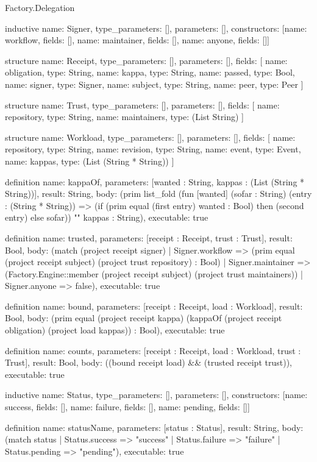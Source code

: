 \begin{lexlean}{Factory.Delegation}
\begin{semanticmodule}
inductive{
  name: Signer,
  type_parameters: [],
  parameters: [],
  constructors: [{name: workflow, fields: []}, {name: maintainer, fields: []}, {name: anyone, fields: []}]
}

structure{
  name: Receipt,
  type_parameters: [],
  parameters: [],
  fields: [
    {name: obligation, type: String},
    {name: kappa, type: String},
    {name: passed, type: Bool},
    {name: signer, type: Signer},
    {name: subject, type: String},
    {name: peer, type: Peer}
  ]
}

structure{
  name: Trust,
  type_parameters: [],
  parameters: [],
  fields: [
    {name: repository, type: String},
    {name: maintainers, type: (List String)}
  ]
}

structure{
  name: Workload,
  type_parameters: [],
  parameters: [],
  fields: [
    {name: repository, type: String},
    {name: revision, type: String},
    {name: event, type: Event},
    {name: kappas, type: (List (String * String))}
  ]
}

definition{
  name: kappaOf,
  parameters: [wanted : String, kappas : (List (String * String))],
  result: String,
  body: (prim list_fold (fun [wanted] (sofar : String) (entry : (String * String)) => (if (prim equal (first entry) wanted : Bool) then (second entry) else sofar)) "" kappas : String),
  executable: true
}

definition{
  name: trusted,
  parameters: [receipt : Receipt, trust : Trust],
  result: Bool,
  body: (match (project receipt signer)
      | Signer.workflow => (prim equal (project receipt subject) (project trust repository) : Bool)
      | Signer.maintainer => (Factory.Engine::member (project receipt subject) (project trust maintainers))
      | Signer.anyone => false),
  executable: true
}

definition{
  name: bound,
  parameters: [receipt : Receipt, load : Workload],
  result: Bool,
  body: (prim equal (project receipt kappa) (kappaOf (project receipt obligation) (project load kappas)) : Bool),
  executable: true
}

definition{
  name: counts,
  parameters: [receipt : Receipt, load : Workload, trust : Trust],
  result: Bool,
  body: ((bound receipt load) && (trusted receipt trust)),
  executable: true
}

inductive{
  name: Status,
  type_parameters: [],
  parameters: [],
  constructors: [{name: success, fields: []}, {name: failure, fields: []}, {name: pending, fields: []}]
}

definition{
  name: statusName,
  parameters: [status : Status],
  result: String,
  body: (match status
    | Status.success => "success"
    | Status.failure => "failure"
    | Status.pending => "pending"),
  executable: true
}


\end{semanticmodule}
\end{lexlean}
